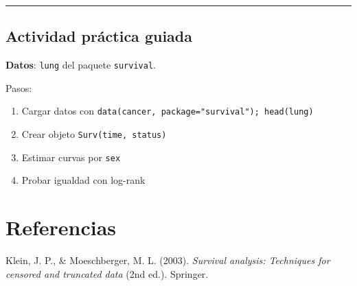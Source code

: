 \documentclass[
]{article}
\newlength{\cslhangindent}
\newenvironment{CSLReferences}[2] %
 {\begin{list}{}{%
  \setlength{\itemindent}{0pt}
  \setlength{\leftmargin}{0pt}
  \setlength{\parsep}{0pt}
  \ifodd #1
   \setlength{\leftmargin}{\cslhangindent}
   \setlength{\itemindent}{-1\cslhangindent}
  \fi
  \setlength{\itemsep}{#2\baselineskip}}}
 {\end{list}}
\providecommand{\tightlist}{%
  \setlength{\itemsep}{0pt}\setlength{\parskip}{0pt}}
\begin{document}
\begin{center}\rule{0.5\linewidth}{0.5pt}\end{center}

\subsection{Actividad práctica
guiada}\label{actividad-pruxe1ctica-guiada}

\textbf{Datos}: \texttt{lung} del paquete \texttt{survival}.

Pasos:

\begin{enumerate}
\def\labelenumi{\arabic{enumi}.}
\tightlist
\item
  Cargar datos con
  \texttt{data(cancer,\ package="survival");\ head(lung)}
\item
  Crear objeto \texttt{Surv(time,\ status)}
\item
  Estimar curvas por \texttt{sex}
\item
  Probar igualdad con log-rank
\end{enumerate}

\section{Referencias}\label{referencias}

\label{refs}
\begin{CSLReferences}{1}{0}
Klein, J. P., \& Moeschberger, M. L. (2003). \emph{Survival analysis:
Techniques for censored and truncated data} (2nd ed.). Springer.

\end{CSLReferences}
\end{document}
